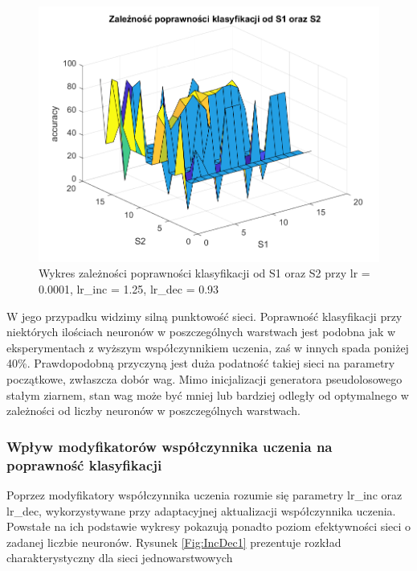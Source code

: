\documentclass[12pt,twoside]{article}
\begin{document}
\begin{figure}[ht]
	\centering
	\includegraphics[width=16cm]{figures/S1S2_2.png}
	\caption{Wykres zależności poprawności klasyfikacji od S1 oraz S2 przy lr = 0.0001, lr\_inc = 1.25, lr\_dec = 0.93}
	\label{Fig:S1S2_2}
\end{figure}

W jego przypadku widzimy silną punktowość sieci.
Poprawność klasyfikacji przy niektórych ilościach neuronów w poszczególnych warstwach jest podobna jak w eksperymentach z wyższym współczynnikiem uczenia, zaś w innych spada poniżej 40\%.
Prawdopodobną przyczyną jest duża podatność takiej sieci na parametry początkowe, zwłaszcza dobór wag.
Mimo inicjalizacji generatora pseudolosowego stałym ziarnem, stan wag może być mniej lub bardziej odległy od optymalnego w zależności od liczby neuronów w poszczególnych warstwach.

\subsubsection{Wpływ modyfikatorów współczynnika uczenia na poprawność klasyfikacji}
Poprzez modyfikatory współczynnika uczenia rozumie się parametry lr\_inc oraz lr\_dec, wykorzystywane przy adaptacyjnej aktualizacji współczynnika uczenia.
Powstałe na ich podstawie wykresy pokazują ponadto poziom efektywności sieci o zadanej liczbie neuronów.
Rysunek \ref{Fig:IncDec1} prezentuje rozkład charakterystyczny dla sieci jednowarstwowych
\end{document}
